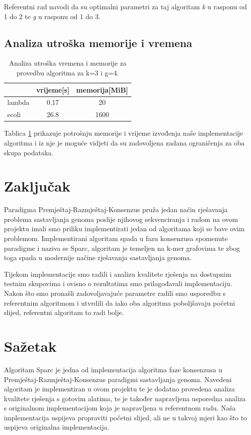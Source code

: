 \documentclass[times, utf8, seminar, numeric]{fer}
\begin{document}
Referentni rad navodi da su optimalni parametri za taj algoritam \emph{k} u rasponu od 1 do 2 te \emph{g} u rasponu od 1 do 3. 

\section{Analiza utroška memorije i vremena}
\begin{table}[htb]
	\centering
	\begin{tabular}{l|cc}
		& \multicolumn{1}{l}{vrijeme[s]} & memorija[MiB] \\ 	\hline
		lambda			& 0.17		& 20 	\\ 	\hline
		ecoli  			& 26.8     	& 1600  \\	\hline
	\end{tabular}
	\caption{Analiza utroška vremena i memorije za provedbu algoritma za k=3 i g=4.}
	\label{table:memorija}
\end{table}

Tablica \ref{table:memorija} prikazuje potrošnju memorije i vrijeme izvođenja naše implementacije algoritma i iz nje je moguće vidjeti da su zadovoljena zadana ograničenja za oba skupa podataka. 


\chapter{Zaključak}
Paradigma Premještaj-Razmještaj-Konsenzus pruža jedan način rješavanja problema sastavljanja genoma poslije njihovog sekvenciranja i radom na ovom projektu imali smo priliku implementirati jedan od algoritama koji se bave ovim problemom. Implementirani algoritam spada u fazu konsenzusa spomenute paradigme i naziva se Sparc, algoritam je temeljen na k-mer grafovima te zbog toga spada u modernije načine rješavanja sastavljanja genoma.

Tijekom implementacije smo radili i analizu kvalitete rješenja na dostupnim testnim skupovima i ovisno o rezultatima smo prilagođavali implementaciju. Nakon što smo pronašli zadovoljavajuće parametre radili smo usporedbu s referentnim algoritmom i utvrdili da iako oba algoritma poboljšavaju početni slijed, referentni algoritam to radi bolje.



\nocite{*}


\chapter{Sažetak}
Algoritam Sparc je jedna od implementacija algoritma faze konsenzusa u Premještaj-Razmještaj-Konsenzus paradigmi sastavljanja genoma. 
Navedeni algoritam je implementiran u ovom projektu te je dodatno provedena analiza kvalitete rješenja s gotovim alatima, te je također napravljena usporedna analiza s originalnom implementacijom koja je napravljena u referentnom radu. Naša implementacija uspijeva propraviti početni slijed, ali ne u takvoj mjeri kao što to uspijeva originalna implementacija.
\end{document}
